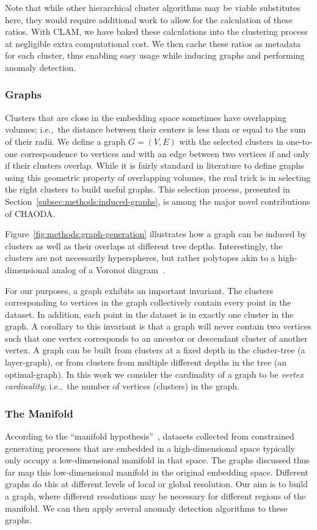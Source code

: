 Note that while other hierarchical cluster algorithms may be viable substitutes here, they would require additional work to allow for the calculation of these ratios.
With CLAM, we have baked these calculations into the clustering process at negligible extra computational cost.
We then cache these ratios as metadata for each cluster, thus enabling easy usage while inducing graphs and performing anomaly detection.

\subsubsection{Graphs}
\label{subsubsec:methods:clam:graphs}
Clusters that are close in the embedding space sometimes have overlapping volumes; i.e.,\ the distance between their centers is less than or equal to the sum of their radii.
We define a graph $G=(V,E)$ with the selected clusters in one-to-one correspondence to vertices and with an edge between two vertices if and only if their clusters overlap.
While it is fairly standard in literature to define graphs using this geometric property of overlapping volumes, the real trick is in selecting the right clusters to build useful graphs.
This selection process, presented in Section~\ref{subsec:methods:induced-graphs}, is among the major novel contributions of CHAODA.

Figure~\ref{fig:methods:graph-generation} illustrates how a graph can be induced by clusters as well as their overlaps at different tree depths.
Interestingly, the clusters are not necessarily hyperspheres, but rather polytopes akin to a high-dimensional analog of a Voronoi diagram~\cite{voronoi1908nouvelles}.

For our purposes, a graph exhibits an important invariant.
The clusters corresponding to vertices in the graph collectively contain every point in the dataset.
In addition, each point in the dataset is in exactly one cluster in the graph.
A corollary to this invariant is that a graph will never contain two vertices such that one vertex corresponds to an ancestor or descendant cluster of another vertex.
A graph can be built from clusters at a fixed depth in the cluster-tree (a layer-graph), or from clusters from multiple different depths in the tree (an optimal-graph).
In this work we consider the cardinality of a graph to be \textit{vertex cardinality}; i.e.,\ the number of vertices (clusters) in the graph.

\subsubsection{The Manifold}
\label{subsubsec:methods:clam:the-manifold}
According to the ``manifold hypothesis''~\cite{fefferman2016testing}, datasets collected from constrained generating processes that are embedded in a high-dimensional space typically only occupy a low-dimensional manifold in that space.
The graphs discussed thus far map this low-dimensional manifold in the original embedding space.
Different graphs do this at different levels of local or global resolution.
Our aim is to build a graph, where different resolutions may be necessary for different regions of the manifold.
We can then apply several anomaly detection algorithms to these graphs.

